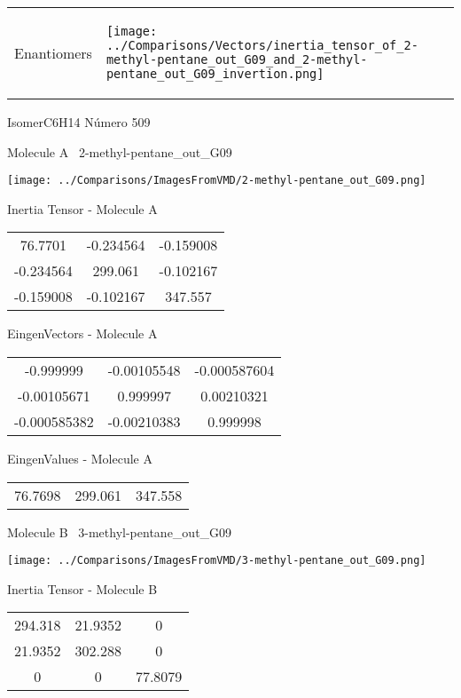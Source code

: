 \vtab[-5mm]
\begin{tabular}{*{2}{m{}}}
\begin{center}
\textcolor{NavyBlue}{\Large Enantiomers}
\end{center}
&
\begin{center}
\texttt{[image: ../Comparisons/Vectors/inertia\_tensor\_of\_2-methyl-pentane\_out\_G09\_and\_2-methyl-pentane\_out\_G09\_invertion.png]}
\end{center}
\end{tabular}

 \newpage

\vtab[-3cm]
\begin{center}
{\large IsomerC6H14 \tab Número 509}
\end{center}
\begin{multicols}{2}
\begin{center}

Molecule A \
2-methyl-pentane\_out\_G09

\texttt{[image: ../Comparisons/ImagesFromVMD/2-methyl-pentane\_out\_G09.png]}

Inertia Tensor - Molecule A \\
\begin{tabular}{|c c c|}
76.7701	 & 	-0.234564	 & 	-0.159008	 \\
-0.234564	 & 	299.061	 & 	-0.102167	 \\
-0.159008	 & 	-0.102167	 & 	347.557
\end{tabular}

\vtab
 EingenVectors - Molecule A     \\
\begin{tabular}{|c c c|}
-0.999999	 & 	-0.00105548	 & 	-0.000587604	 \\
-0.00105671	 & 	0.999997	 & 	0.00210321	 \\
-0.000585382	 & 	-0.00210383	 & 	0.999998
\end{tabular}

\vtab
 EingenValues - Molecule A     \\
\begin{tabular}{|c c c|}
76.7698	 & 	299.061	 & 	347.558	 \\
\end{tabular}
\columnbreak

Molecule B \
3-methyl-pentane\_out\_G09

\texttt{[image: ../Comparisons/ImagesFromVMD/3-methyl-pentane\_out\_G09.png]}

Inertia Tensor - Molecule B \\
\begin{tabular}{|c c c|}
294.318	 & 	21.9352	 & 	0	 \\
21.9352	 & 	302.288	 & 	0	 \\
0	 & 	0	 & 	77.8079
\end{tabular}


\end{center}
\end{multicols}
